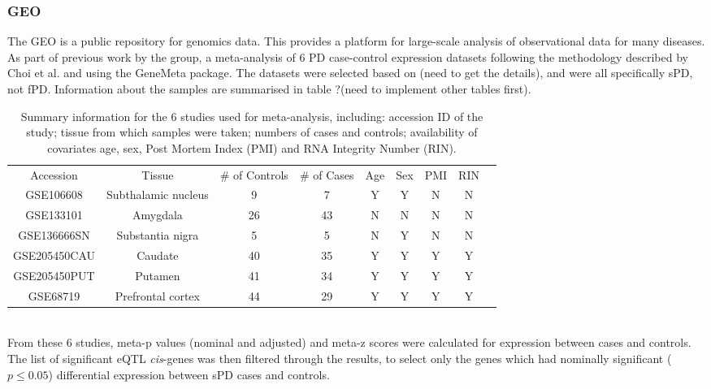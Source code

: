 \documentclass{article}
\begin{document}
\subsubsection{GEO}
The GEO \cite{Barrett2012NCBISetsupdate} is a public repository for genomics data. This provides a platform for large-scale analysis of observational data for many diseases. As part of previous work by the group, a meta-analysis of 6 PD case-control expression datasets following the methodology described by Choi et al.\cite{Choi2003CombiningVariation} and using the GeneMeta package\cite{LusaL2024GeneMeta:Experiments.}. The datasets were selected based on (need to get the details), and were all specifically sPD, not fPD. Information about the samples are summarised in table ?(need to implement other tables first).
\begin{table}[h]
    \hskip-1.5cm
    \begin{tabular}{ |c|c|c|c|c|c|c|c|c| }
        \hline
        Accession & Tissue & \# of Controls & \# of Cases & Age & Sex & PMI & RIN \\
        GSE106608 & Subthalamic nucleus & 9 & 7 & Y & Y & N & N \\
        GSE133101 & Amygdala & 26 & 43 & N & N & N & N \\
        GSE136666SN & Substantia nigra & 5 & 5 & N & Y & N & N \\
        GSE205450CAU & Caudate & 40 & 35 & Y & Y & Y & Y \\
        GSE205450PUT & Putamen & 41 & 34 & Y & Y & Y & Y \\
        GSE68719 & Prefrontal cortex & 44 & 29 & Y & Y & Y & Y \\
         \hline
    \end{tabular}
    \caption{Summary information for the 6 studies used for meta-analysis, including: accession ID of the study; tissue from which samples were taken; numbers of cases and controls; availability of covariates age, sex, Post Mortem Index (PMI) and RNA Integrity Number (RIN).}
    \label{tab:my_label}
\end{table}
\\From these 6 studies, meta-p values (nominal and adjusted) and meta-z scores were calculated for expression between cases and controls. The list of significant eQTL \textit{cis}-genes was then filtered through the results, to select only the genes which had nominally significant ($p\leq0.05$) differential expression between sPD cases and controls.
\end{document}
